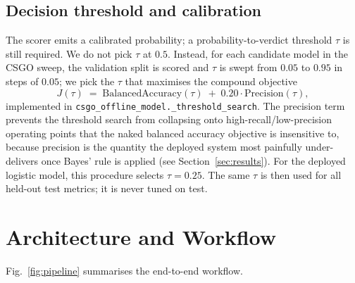 \documentclass[conference,10pt]{IEEEtran}
\begin{document}
\subsection{Decision threshold and calibration}
\label{sec:threshold}

The scorer emits a calibrated probability; a probability-to-verdict
threshold $\tau$ is still required. We do not pick $\tau$ at $0.5$.
Instead, for each candidate model in the CSGO sweep, the validation
split is scored and $\tau$ is swept from $0.05$ to $0.95$ in steps of
$0.05$; we pick the $\tau$ that maximises the compound objective
\begin{equation}
J(\tau) \;=\; \mathrm{BalancedAccuracy}(\tau) \;+\; 0.20 \cdot
\mathrm{Precision}(\tau),
\label{eq:threshold-objective}
\end{equation}
implemented in \texttt{csgo\_offline\_model.\_threshold\_search}. The
precision term prevents the threshold search from collapsing onto
high-recall/low-precision operating points that the naked balanced
accuracy objective is insensitive to, because precision is the quantity
the deployed system most painfully under-delivers once Bayes' rule is
applied (see Section~\ref{sec:results}). For the deployed logistic
model, this procedure selects $\tau = 0.25$. The same $\tau$ is then
used for all held-out test metrics; it is never tuned on test.

\section{Architecture and Workflow}
\label{sec:arch}

Fig.~\ref{fig:pipeline} summarises the end-to-end workflow.
\end{document}
